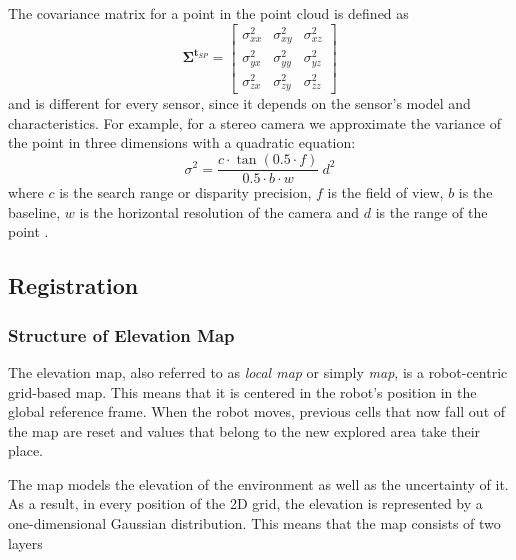 \begin{enumerate}
        The covariance matrix for a point in the point cloud is defined as
        \begin{equation}
            \mathbf{\Sigma}^{\mathbf{t}_{SP}} =
            \begin{bmatrix}
                \sigma^2_{xx} & \sigma^2_{xy} & \sigma^2_{xz} \\
                \sigma^2_{yx} & \sigma^2_{yy} & \sigma^2_{yz} \\
                \sigma^2_{zx} & \sigma^2_{zy} & \sigma^2_{zz}
            \end{bmatrix}
        \end{equation}
        and is different for every sensor,
        since it depends on the sensor's model and characteristics.
        For example, for a stereo camera we approximate the variance of
        the point in three dimensions with a quadratic equation:
        \begin{equation}
            \sigma^2 =
            \frac{c \cdot \tan(0.5 \cdot f)}{0.5 \cdot b \cdot w} \ d^2
        \end{equation}
        where
        $c$ is the search range or disparity precision,
        $f$ is the field of view,
        $b$ is the baseline,
        $w$ is the horizontal resolution of the camera and
        $d$ is the range of the point
        \parencite{Huesing2014}.
\end{enumerate}


\subsection{Registration}

\subsubsection{Structure of Elevation Map} \label{map_structure}

The elevation map, also referred to as \textit{local map} or simply
\textit{map}, is a robot-centric grid-based map.
This means that it is centered in the robot's position in the
global reference frame.
When the robot moves, previous cells that now fall out of the map are
reset and values that belong to the new explored area take their place.

The map models the elevation of the environment as well as the uncertainty
of it.
As a result, in every position of the 2D grid, the elevation is
represented by a one-dimensional Gaussian distribution.
This means that the map consists of two layers

